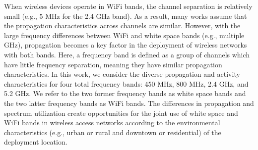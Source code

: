 When wireless devices operate in WiFi bands, the channel separation is relatively 
small (e.g., 5 MHz for the 2.4 GHz band). As a result, many works assume that
the propagation characteristics across channels are similar. However, with the
large frequency differences between WiFi and white space bands (e.g., multiple GHz),
propagation becomes a key factor in the deployment of wireless networks with both bands.
Here, a frequency band is defined as a group of channels which have
little frequency separation, meaning they have similar propagation characteristics.
In this work, we consider the diverse propagation and activity characteristics
for four total frequency bands: 450 MHz, 800 MHz, 2.4 GHz, and 5.2 GHz.
We refer to the two former frequency bands as white space bands and
the two latter frequency bands as WiFi bands.
The differences in propagation and spectrum utilization create opportunities
for the joint use of white space and WiFi bands in wireless access networks according
to the environmental characteristics (e.g., urban or rural and downtown or residential)
of the deployment location.






